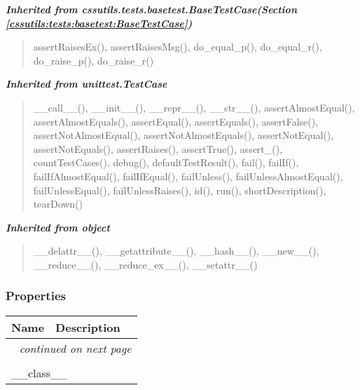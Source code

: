 \large{\textbf{\textit{Inherited from cssutils.tests.basetest.BaseTestCase\textit{(Section \ref{cssutils:tests:basetest:BaseTestCase})}}}}

\begin{quote}
assertRaisesEx(), assertRaisesMsg(), do\_equal\_p(), do\_equal\_r(), do\_raise\_p(), do\_raise\_r()
\end{quote}

\large{\textbf{\textit{Inherited from unittest.TestCase}}}

\begin{quote}
\_\_call\_\_(), \_\_init\_\_(), \_\_repr\_\_(), \_\_str\_\_(), assertAlmostEqual(), assertAlmostEquals(), assertEqual(), assertEquals(), assertFalse(), assertNotAlmostEqual(), assertNotAlmostEquals(), assertNotEqual(), assertNotEquals(), assertRaises(), assertTrue(), assert\_(), countTestCases(), debug(), defaultTestResult(), fail(), failIf(), failIfAlmostEqual(), failIfEqual(), failUnless(), failUnlessAlmostEqual(), failUnlessEqual(), failUnlessRaises(), id(), run(), shortDescription(), tearDown()
\end{quote}

\large{\textbf{\textit{Inherited from object}}}

\begin{quote}
\_\_delattr\_\_(), \_\_getattribute\_\_(), \_\_hash\_\_(), \_\_new\_\_(), \_\_reduce\_\_(), \_\_reduce\_ex\_\_(), \_\_setattr\_\_()
\end{quote}


  \subsubsection{Properties}

    \vspace{-1cm}
\hspace{\varindent}\begin{longtable}{|p{\varnamewidth}|p{\vardescrwidth}|l}
\cline{1-2}
\cline{1-2} \centering \textbf{Name} & \centering \textbf{Description}& \\
\cline{1-2}
\endhead\cline{1-2}\multicolumn{3}{r}{\small\textit{continued on next page}}\\\endfoot\cline{1-2}
\endlastfoot\multicolumn{2}{|l|}{\textit{Inherited from object}}\\
\multicolumn{2}{|p{\varwidth}|}{\raggedright \_\_class\_\_}\\
\cline{1-2}
\end{longtable}

